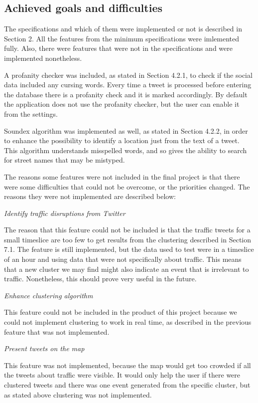 \subsection{Achieved goals and difficulties}
The specifications and which of them were implemented or not is described in
Section 2. All the features from the minimum specifications were imlemented
fully. Also, there were features that were not in the specifications and were
implemented nonetheless.

A profanity checker was included, as stated in Section 4.2.1, to check if the social data included any
cursing words. Every time a tweet is processed before entering the database
there is a profanity check and it is marked accordingly. By default the
application does not use the profanity checker, but the user can enable it from
the settings.

Soundex algorithm was implemented as well, as stated in Section 4.2.2, in order to enhance the possibility to identify
a location just from the text of a tweet. This algorithm understands
misspelled words, and so gives the ability to search for street names that may
be mistyped.

The reasons some features were not included in the final project is
that there were some difficulties that could not be overcome, or the priorities
changed.
The reasons they were not implemented are described below:

\emph{Identify traffic disruptions from Twitter}

The reason that this feature could not be included is that the traffic tweets
for a small timeslice are too few to get results from the clustering described
in Section 7.1. The feature is still implemented, but the data used to test
were in a timeslice of an hour and using data that were not specifically about
traffic. This means that a new cluster we may find might also indicate an
event that is irrelevant to traffic. Nonetheless, this should prove very useful
in the future.

\emph{Enhance clustering algorithm}

This feature could not be included in the product of this project because we
could not implement clustering to work in real time, as described in the
previous feature that was not implemented.

\emph{Present tweets on the map}

This feature was not implemented, because the map would get too crowded if all
the tweets about traffic were visible. It would only help the user if there
were clustered tweets and there was one event generated from the specific
cluster, but as stated above clustering was not implemented.

